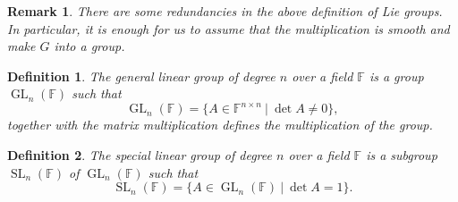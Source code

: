 \documentclass{article}
\newtheorem{definition}{Definition}[section]
\newtheorem{remark}{Remark}[section]
\numberwithin{equation}{section}
\DeclareMathOperator{\GL}{GL}
\DeclareMathOperator{\SL}{SL}
\begin{document}
\begin{remark}
There are some redundancies in the above definition of Lie groups. In particular, it is enough for us to assume that the multiplication is smooth and make $G$ into a group. 
\end{remark}

\begin{definition}
The general linear group of degree $n$ over a field $\mathbb{F}$ is a group $\GL_n(\mathbb{F})$ such that 
\begin{equation*}
\GL_n(\mathbb{F}) = \{A\in\mathbb{F}^{n\times n}\:|\: \det A \not = 0\},
\end{equation*}
together with the matrix multiplication defines the multiplication of the group.
\end{definition}

\begin{definition}
The special linear group of degree $n$ over a field $\mathbb{F}$ is a subgroup $\SL_n(\mathbb{F})$ of $\GL_n(\mathbb{F})$ such that 
\begin{equation*}
\SL_n(\mathbb{F}) = \{A\in\GL_n(\mathbb{F})\:|\: \det A = 1\}.
\end{equation*}
\end{definition}
\end{document}
